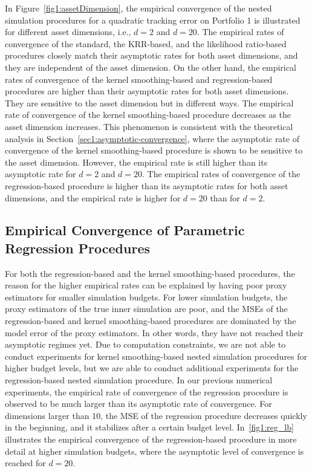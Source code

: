 In Figure~\ref{fig1:assetDimension}, the empirical convergence of the nested simulation procedures for a quadratic tracking error on Portfolio 1 is illustrated for different asset dimensions, i.e., $d = 2$ and $d = 20$.
The empirical rates of convergence of the standard, the KRR-based, and the likelihood ratio-based procedures closely match their asymptotic rates for both asset dimensions, and they are independent of the asset dimension.
On the other hand, the empirical rates of convergence of the kernel smoothing-based and regression-based procedures are higher than their asymptotic rates for both asset dimensions.
They are sensitive to the asset dimension but in different ways.
The empirical rate of convergence of the kernel smoothing-based procedure decreases as the asset dimension increases.
This phenomenon is consistent with the theoretical analysis in Section~\ref{sec1:asymptotic-convergence}, where the asymptotic rate of convergence of the kernel smoothing-based procedure is shown to be sensitive to the asset dimension.
However, the empirical rate is still higher than its asymptotic rate for $d = 2$ and $d = 20$.
The empirical rates of convergence of the regression-based procedure is higher than its asymptotic rates for both asset dimensions, and the empirical rate is higher for $d = 20$ than for $d = 2$.

\subsection{Empirical Convergence of Parametric Regression Procedures} \label{sec1:regression-convergence}

For both the regression-based and the kernel smoothing-based procedures, the reason for the higher empirical rates can be explained by having poor proxy estimators for smaller simulation budgets.
For lower simulation budgets, the proxy estimators of the true inner simulation are poor, and the MSEs of the regression-based and kernel smoothing-based procedures are dominated by the model error of the proxy estimators.
In other words, they have not reached their asymptotic regimes yet.
Due to computation constraints, we are not able to conduct experiments for kernel smoothing-based nested simulation procedures for higher budget levels, but we are able to conduct additional experiments for the regression-based nested simulation procedure.
In our previous numerical experiments, the empirical rate of convergence of the regression procedure is observed to be much larger than its asymptotic rate of convergence.
For dimensions larger than 10, the MSE of the regression procedure decreases quickly in the beginning, and it stabilizes after a certain budget level.
In~\ref{fig1:reg_lb} illustrates the empirical convergence of the regression-based procedure in more detail at higher simulation budgets, where the asymptotic level of convergence is reached for $d = 20$.

